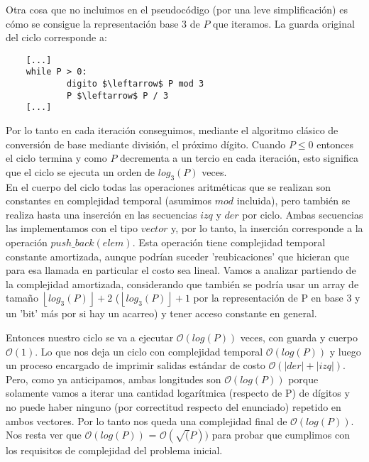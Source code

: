 	Otra cosa que no incluimos en el pseudocódigo (por una leve simplificación) es cómo se consigue la representación base 3 de $P$ que iteramos. La guarda original del ciclo corresponde a:

	\begin{lstlisting}
	[...]
	while P > 0:
        	digito $\leftarrow$ P mod 3
        	P $\leftarrow$ P / 3
	[...]
	\end{lstlisting}

	Por lo tanto en cada iteración conseguimos, mediante el algoritmo clásico de conversión de base mediante división, el próximo dígito. Cuando $P \leq 0$ entonces el ciclo termina y como $P$ decrementa a un tercio en cada iteración, esto significa que el ciclo se ejecuta un orden de $log_3(P)$ veces.
	\\

	En el cuerpo del ciclo todas las operaciones aritméticas que se realizan son constantes en complejidad temporal (asumimos $mod$ incluida), pero también se realiza hasta una inserción en las secuencias $izq$ y $der$ por ciclo. Ambas secuencias las implementamos con el tipo $vector$ y, por lo tanto, la inserción corresponde a la operación $push\_back(elem)$. Esta operación tiene complejidad temporal constante amortizada, aunque podrían suceder 'reubicaciones' que hicieran que para esa llamada en particular el costo sea lineal. Vamos a analizar partiendo de la complejidad amortizada, considerando que también se podría usar un array de tamaño $\left \lfloor{log_3(P)}\right \rfloor + 2$ ($\left \lfloor{log_3(P)}\right \rfloor + 1$ por la representación de P en base 3 y un 'bit' más por si hay un acarreo) y tener acceso constante en general.

	Entonces nuestro ciclo se va a ejecutar $\mathcal{O} (log(P))$ veces, con guarda y cuerpo $\mathcal{O} (1)$. Lo que nos deja un ciclo con complejidad temporal $\mathcal{O} (log(P))$ y luego un proceso encargado de imprimir salidas estándar de costo $\mathcal{O} (|der| + |izq|)$. Pero, como ya anticipamos, ambas longitudes son $\mathcal{O} (log(P))$ porque solamente vamos a iterar una cantidad logarítmica (respecto de P) de dígitos y no puede haber ninguno (por correctitud respecto del enunciado) repetido en ambos vectores. Por lo tanto nos queda una complejidad final de $\mathcal{O} (log(P))$.
	\\

	Nos resta ver que $\mathcal{O} (log(P))$ = $\mathcal{O} (\sqrt(P))$ para probar que cumplimos con los requisitos de complejidad del problema inicial.

